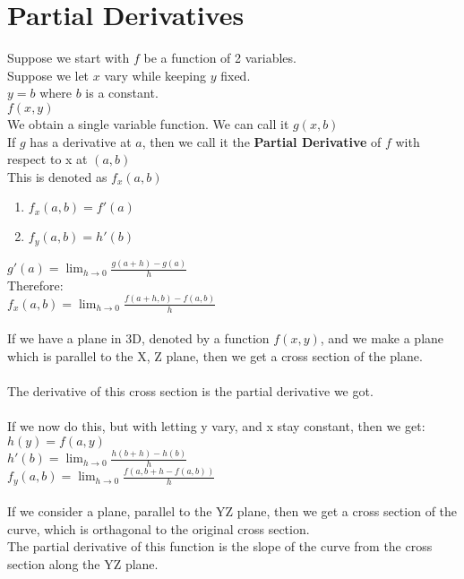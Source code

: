 \documentclass[]{article}
\title{\docTitle}
\author{\docAuthor}
\date{\today}
\begin{document}
\maketitle

\section*{Partial Derivatives}
Suppose we start with $f$ be a function of 2 variables.\\
Suppose we let $x$ vary while keeping $y$ fixed.\\
$y = b$ where $b$ is a constant.\\

$f(x,y)$\\
We obtain a single variable function. We can call it $g(x, b)$\\
If $g$ has a derivative at $a$, then we call it the \textbf{Partial Derivative} of $f$ with respect to x at $(a, b)$\\
This is denoted as $f_x(a,b)$
\begin{enumerate}
    \item $f_x(a,b) = f'(a)$
    \item $f_y(a,b) = h'(b)$
\end{enumerate}

$g'(a) = \lim_{h \to 0}\frac{g(a+h)-g(a)}{h}$\\
Therefore:\\
$f_x(a,b) = \lim_{h \to 0}\frac{f(a+h,b)-f(a, b)}{h}$\\
\\
If we have a plane in 3D, denoted by a function $f(x, y)$, and we make a plane which is parallel to the X, Z plane, then we get a cross section of the plane.\\
\\
The derivative of this cross section is the partial derivative we got.\\
\\
If we now do this, but with letting y vary, and x stay constant, then we get:\\
$h(y)=f(a,y)$\\

$h'(b) = \lim_{h\to 0}\frac{h(b+h)-h(b)}{h}$\\
$f_y(a,b) = \lim_{h\to 0}\frac{f(a, b+h - f(a,b))}{h}$\\
\\
If we consider a plane, parallel to the YZ plane, then we get a cross section of the curve, which is orthagonal to the original cross section.\\
The partial derivative of this function is the slope of the curve from the cross section along the YZ plane.\\
\end{document}
